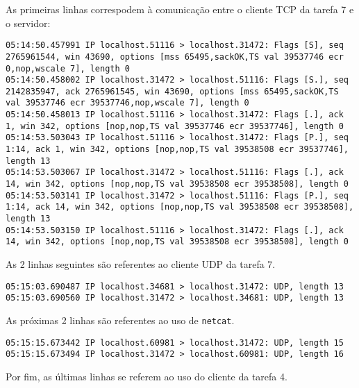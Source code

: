 \documentclass[a4paper,10pt]{article}
\begin{document}
As primeiras linhas correspodem à comunicação entre o cliente TCP da tarefa 7 e o servidor:

\begin{lstlisting}
05:14:50.457991 IP localhost.51116 > localhost.31472: Flags [S], seq 2765961544, win 43690, options [mss 65495,sackOK,TS val 39537746 ecr 0,nop,wscale 7], length 0
05:14:50.458002 IP localhost.31472 > localhost.51116: Flags [S.], seq 2142835947, ack 2765961545, win 43690, options [mss 65495,sackOK,TS val 39537746 ecr 39537746,nop,wscale 7], length 0
05:14:50.458013 IP localhost.51116 > localhost.31472: Flags [.], ack 1, win 342, options [nop,nop,TS val 39537746 ecr 39537746], length 0
05:14:53.503043 IP localhost.51116 > localhost.31472: Flags [P.], seq 1:14, ack 1, win 342, options [nop,nop,TS val 39538508 ecr 39537746], length 13
05:14:53.503067 IP localhost.31472 > localhost.51116: Flags [.], ack 14, win 342, options [nop,nop,TS val 39538508 ecr 39538508], length 0
05:14:53.503141 IP localhost.31472 > localhost.51116: Flags [P.], seq 1:14, ack 14, win 342, options [nop,nop,TS val 39538508 ecr 39538508], length 13
05:14:53.503150 IP localhost.51116 > localhost.31472: Flags [.], ack 14, win 342, options [nop,nop,TS val 39538508 ecr 39538508], length 0

\end{lstlisting}

As 2 linhas seguintes são referentes ao cliente UDP da tarefa 7.

\begin{lstlisting}
05:15:03.690487 IP localhost.34681 > localhost.31472: UDP, length 13
05:15:03.690560 IP localhost.31472 > localhost.34681: UDP, length 13

\end{lstlisting}

As próximas 2 linhas são referentes ao uso de {\tt netcat}.

\begin{lstlisting}
05:15:15.673442 IP localhost.60981 > localhost.31472: UDP, length 15
05:15:15.673494 IP localhost.31472 > localhost.60981: UDP, length 16

\end{lstlisting}

Por fim, as últimas linhas se referem ao uso do cliente da tarefa 4.
\end{document}
